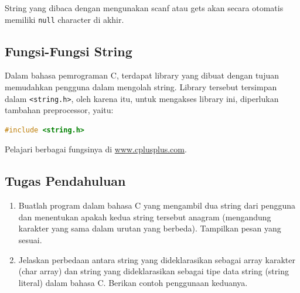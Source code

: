 String yang dibaca dengan mengunakan scanf atau gets akan secara otomatis memiliki \verb|null| character di akhir.

\subsection{Fungsi-Fungsi String}
Dalam bahasa pemrograman C, terdapat library yang dibuat dengan tujuan memudahkan pengguna dalam mengolah string.
Library tersebut tersimpan dalam \verb|<string.h>|,
oleh karena itu, untuk mengakses library ini, diperlukan tambahan preprocessor, yaitu:
\begin{lstlisting}[language=c]
	#include <string.h>
\end{lstlisting}

Pelajari berbagai fungsinya di \href{http://www.cplusplus.com/}{www.cplusplus.com}.

\subsection{Tugas Pendahuluan}
\begin{enumerate}
	\item Buatlah program dalam bahasa C yang mengambil dua string dari pengguna dan menentukan apakah kedua string tersebut anagram (mengandung karakter yang sama dalam urutan yang berbeda).
	      Tampilkan pesan yang sesuai.
	\item Jelaskan perbedaan antara string yang dideklarasikan sebagai array karakter (char array) dan string yang dideklarasikan sebagai tipe data string (string literal) dalam bahasa C. Berikan contoh penggunaan keduanya.
\end{enumerate}